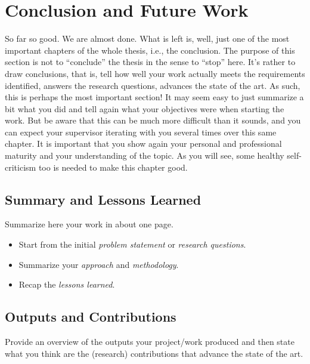 \chapter{Conclusion and Future Work}
\label{capitolo6}
\thispagestyle{empty}


So far so good. We are almost done. What is left is, well, just one of the most important chapters of the whole thesis, i.e., the conclusion. The purpose of this section is not to ``conclude'' the thesis in the sense to ``stop'' here. It's rather to draw conclusions, that is, tell how well your work actually meets the requirements identified, answers the research questions, advances the state of the art. As such, this is perhaps the most important section! It may seem easy to just summarize a bit what you did and tell again what your objectives were when starting the work. But be aware that this can be much more difficult than it sounds, and you can expect your supervisor iterating with you several times over this same chapter. It is important that you show again your personal and professional maturity and your understanding of the topic. As you will see, some healthy self-criticism too is needed to make this chapter good.

\section{Summary and Lessons Learned}
Summarize here your work in about one page.

\begin{itemize}
\item[\Square] Start from the initial \emph{problem statement} or \emph{research questions}.
\item[\Square] Summarize your \emph{approach} and \emph{methodology}.
\item[\Square] Recap the \emph{lessons learned}.
\end{itemize}


\section{Outputs and Contributions}
Provide an overview of the outputs your project/work produced and then state what you think are the (research) contributions that advance the state of the art. 

